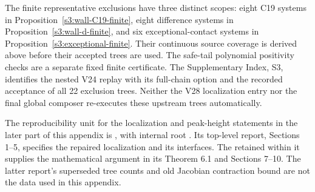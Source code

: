 \documentclass[11pt,reqno]{amsart}
\theoremstyle{definition}
\theoremstyle{remark}
\begin{document}
The finite representative exclusions have three distinct scopes:
eight C19 systems in Proposition~\ref{s3:wall-C19-finite}, eight
difference systems in Proposition~\ref{s3:wall-d-finite}, and six
exceptional-contact systems in Proposition~\ref{s3:exceptional-finite}.
Their continuous source coverage is derived above before their accepted
trees are used. The safe-tail polynomial positivity checks are a
separate fixed finite certificate. The Supplementary Index, S3,
identifies the nested V24 replay with its full-chain option and the
recorded acceptance of all 22 exclusion trees. Neither the V28
localization entry nor the final global composer re-executes these
upstream trees automatically.

The reproducibility unit for the localization and peak-height statements
in the later part of this appendix is , with
internal root . Its top-level report, Sections
1--5, specifies the repaired localization and its interfaces. The
 retained within it supplies the
mathematical argument in its Theorem 6.1 and Sections 7--10. The latter
report's superseded tree counts and old Jacobian contraction bound are
not the data used in this appendix.
\end{document}

